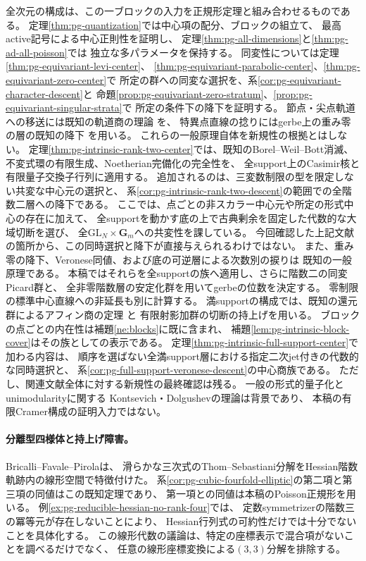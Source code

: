 全次元の構成は、この一ブロックの入力を正規形定理と組み合わせるものである。
定理\ref{thm:pg-quantization}では中心項の配分、ブロックの組立て、
最高active記号による中心正則性を証明し、
定理\ref{thm:pg-all-dimensions}と\ref{thm:pg-ad-all-poisson}では
独立な多パラメータを保持する。
同変性については定理\ref{thm:pg-equivariant-levi-center}、
\ref{thm:pg-equivariant-parabolic-center}、\ref{thm:pg-equivariant-zero-center}で
所定の群への同変な選択を、系\ref{cor:pg-equivariant-character-descent}と
命題\ref{prop:pg-equivariant-zero-stratum}、\ref{prop:pg-equivariant-singular-strata}で
所定の条件下の降下を証明する。
節点・尖点軌道への移送には既知の軌道商の理論
\cite[Propositions~7.12, 7.17]{PMilneGroups}を、
特異点直線の捻りにはgerbe上の重み零の層の既知の降下
\cite[Proposition~4.10, p.~1487]{PBerghSchnurerGerbes}を用いる。
これらの一般原理自体を新規性の根拠とはしない。
定理\ref{thm:pg-intrinsic-rank-two-center}では、既知のBorel--Weil--Bott消滅、
不変式環の有限生成、Noetherian完備化の完全性を、
全support上のCasimir核と有限量子交換子行列に適用する。
追加されるのは、三変数制限の型を限定しない共変な中心元の選択と、
系\ref{cor:pg-intrinsic-rank-two-descent}の範囲での全階数二層への降下である。
ここでは、点ごとの非スカラー中心元や所定の形式中心の存在に加えて、
全supportを動かす底の上で古典剰余を固定した代数的な大域切断を選び、
全$\mathrm{GL}_N\times\mathbf G_m$への共変性を課している。
今回確認した上記文献の箇所から、この同時選択と降下が直接与えられるわけではない。
また、重み零の降下、Veronese同値、および底の可逆層による次数別の捩りは
既知の一般原理である\cite{PBerghSchnurerGerbes,PSmithVeronese,PVdBNoncommP1Bundles}。
本稿ではそれらを全supportの族へ適用し、さらに階数二の同変Picard群と、
全非零階数層の安定化群を用いてgerbeの位数を決定する。
零制限の標準中心直線への非延長も別に計算する。
満supportの構成では、既知の還元群によるアフィン商の定理
\cite[\S2, Proposition~2.2, Theorem~2.1]{PArzhantsevMatsushima}と
有限射影加群の切断の持上げを用いる。
ブロックの点ごとの内在性は補題\ref{ne:blocks}に既に含まれ、
補題\ref{lem:pg-intrinsic-block-cover}はその族としての表示である。
定理\ref{thm:pg-intrinsic-full-support-center}で加わる内容は、
順序を選ばない全満support層における指定二次jet付きの代数的な同時選択と、
系\ref{cor:pg-full-support-veronese-descent}の中心商族である。
ただし、関連文献全体に対する新規性の最終確認は残る。
一般の形式的量子化とunimodularityに関する
Kontsevich・Dolgushevの理論\cite{PKontsevich,PDolgushev}は背景であり、
本稿の有限Cramer構成の証明入力ではない。

\paragraph{分離型四様体と持上げ障害。}
Bricalli--Favale--Pirola\cite[Theorem~BおよびTheorem~3.4]{PBricalliFavalePirola}は、
滑らかな三次式のThom--Sebastiani分解をHessian階数軌跡内の線形空間で特徴付けた。
系\ref{cor:pg-cubic-fourfold-elliptic}の第二項と第三項の同値はこの既知定理であり、
第一項との同値は本稿のPoisson正規形を用いる。
例\ref{ex:pg-reducible-hessian-no-rank-four}では、
定数symmetrizerの階数三の冪等元が存在しないことにより、
Hessian行列式の可約性だけでは十分でないことを具体化する。
この線形代数の議論は、特定の座標表示で混合項がないことを調べるだけでなく、
任意の線形座標変換による$(3,3)$分解を排除する。


